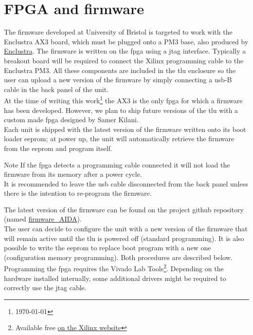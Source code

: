 \section{FPGA and firmware}\label{ch:fpgahardware}
The firmware developed at University of Bristol is targeted to work with the Enclustra  AX3 board, which must be plugged onto a PM3 base, also produced by \href{http://www.enclustra.com/en/home/}{Enclustra}. The firmware is written on the \gls{fpga} using a \gls{jtag} interface. Typically a breakout board will be required to connect the Xilinx programming cable to the Enclustra PM3. All these components are included in the \gls{tlu} enclosure so the user can upload a new version of the firmware by simply connecting a \gls{usb}-B cable in the back panel of the unit.\\
At the time of writing this work\footnote{\monthyeardate\today} the AX3 is the only \gls{fpga} for which a firmware has been developed. However, we plan to ship future versions of the \gls{tlu} with a custom made \gls{fpga} designed by Samer Kilani.\\
Each unit is shipped with the latest version of the firmware written onto its boot loader \gls{eeprom}; at power up, the unit will automatically retrieve the firmware from the \gls{eeprom} and program itself.
\begin{alertinfo}{Note}
    If the \gls{fpga} detects a programming cable connected it will not load the firmware from its memory after a power cycle.\\
    It is recommended to leave the \gls{usb} cable disconnected from the back panel unless there is the intention to re-program the firmware.
\end{alertinfo}
The latest version of the firmware can be found on the project github repository (named \href{https://github.com/PaoloGB/firmware_AIDA}{firmware\_AIDA}).\\
The user can decide to configure the unit with a new version of the firmware that will remain active until the \gls{tlu} is powered off (standard programming). It is also possible to write the \gls{eeprom} to replace boot program with a new one (configuration memory programming). Both procedures are described below.
Programming the \gls{fpga} requires the Vivado Lab Tools\footnote{Available free \href{https://www.xilinx.com/support/download.html}{on the Xilinx website}}. Depending on the hardware installed internally, some additional drivers might be required to correctly use the \gls{jtag} cable.\\

